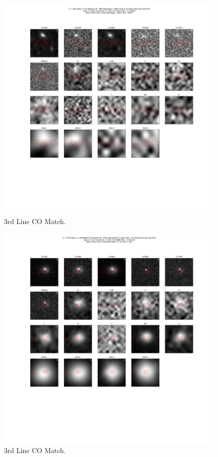 \begin{figure}[tbp]
\centering \includegraphics[width=120mm]{Matched/ASPECS_Cutout_9.png}
\caption{3rd Line CO Match.}
\label{fig:Match_Three}
\end{figure}

\begin{figure}[tbp]
\centering \includegraphics[width=120mm]{Matched/ASPECS_Cutout_10.png}
\caption{3rd Line CO Match.}
\label{fig:Match_Three}
\end{figure}

